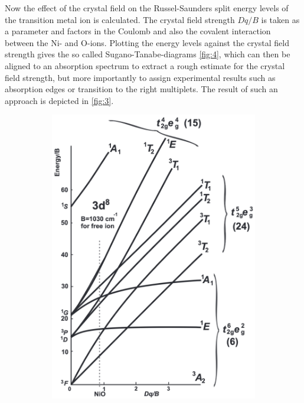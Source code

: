 Now the effect of the crystal field on the Russel-Saunders split energy levels of the transition metal ion is calculated.
The crystal field strength $Dq/B$ is taken as a parameter and factors in the Coulomb and also the covalent interaction between the Ni- and O-ions.
Plotting the energy levels against the crystal field strength gives the so called Sugano-Tanabe-diagrams \autoref{fig:4}, which can then be aligned to an absorption spectrum to extract a rough estimate for the crystal field strength, but more importantly to assign experimental results such as absorption edges or transition to the right multiplets.
The result of such an approach is depicted in \autoref{fig:3}.

\begin{figure}[ht]
    \centering
    \begin{subfigure}[b]{0.4\textwidth}
        \includegraphics[width=\textwidth]{pictures/4.png}
        \caption{}

\end{subfigure}
\end{figure}
